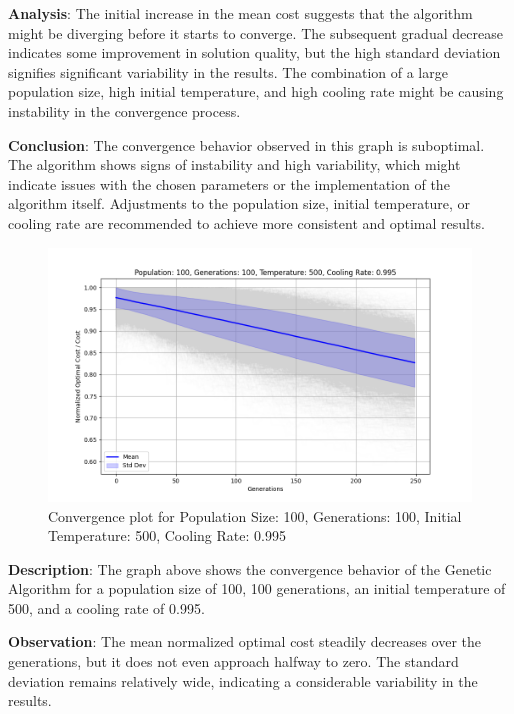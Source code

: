 \documentclass{article}
\begin{document}
    \textbf{Analysis}: The initial increase in the mean cost suggests that the algorithm might be diverging before it starts to converge. The subsequent gradual decrease indicates some improvement in solution quality, but the high standard deviation signifies significant variability in the results. The combination of a large population size, high initial temperature, and high cooling rate might be causing instability in the convergence process.

    \textbf{Conclusion}: The convergence behavior observed in this graph is suboptimal. The algorithm shows signs of instability and high variability, which might indicate issues with the chosen parameters or the implementation of the algorithm itself. Adjustments to the population size, initial temperature, or cooling rate are recommended to achieve more consistent and optimal results.

    \begin{figure}[H]
        \centering
        \includegraphics[width=\textwidth]{genetic_simulated_annealing_hybrid/Population_100_Generations_100_Temperature_500_CoolingRate_0.995}
        \caption{Convergence plot for Population Size: 100, Generations: 100, Initial Temperature: 500, Cooling Rate: 0.995}
        \label{fig:pop100_gen100_temp500_cr0.995}
    \end{figure}

    \textbf{Description}: The graph above shows the convergence behavior of the Genetic Algorithm for a population size of 100, 100 generations, an initial temperature of 500, and a cooling rate of 0.995.

    \textbf{Observation}: The mean normalized optimal cost steadily decreases over the generations, but it does not even approach halfway to zero. The standard deviation remains relatively wide, indicating a considerable variability in the results.
\end{document}
